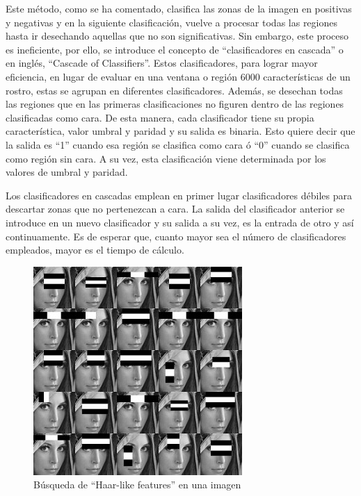 Este método, como se ha comentado, clasifica las zonas de la imagen en positivas y negativas y en la siguiente clasificación, vuelve a procesar todas las regiones hasta ir desechando aquellas que no son significativas. Sin embargo, este proceso es ineficiente, por ello, se introduce el concepto de ``clasificadores en cascada'' o en inglés, ``Cascade of Classifiers''. Estos clasificadores, para lograr mayor eficiencia, en lugar de evaluar en una ventana o región 6000 características de un rostro, estas se agrupan en diferentes clasificadores. Además, se desechan todas las regiones que en las primeras clasificaciones no figuren dentro de las regiones clasificadas como cara. De esta manera, cada clasificador tiene su propia característica, valor umbral y paridad y su salida es binaria. Esto quiere decir que la salida es ``1'' cuando esa región se clasifica como cara ó ``0'' cuando se clasifica como región sin cara. A su vez, esta clasificación viene determinada por los valores de umbral y paridad.

Los clasificadores en cascadas emplean en primer lugar clasificadores débiles para descartar zonas que no pertenezcan a cara. La salida del clasificador anterior se introduce en un nuevo clasificador y su salida a su vez, es la entrada de otro y así continuamente. Es de esperar que, cuanto mayor sea el número de clasificadores empleados, mayor es el tiempo de cálculo.


\begin{figure}
\centering
\includegraphics[scale = 0.7]{capitulo_02/figuras_dir/haarcascade.jpg}
\caption{Búsqueda de ``Haar-like features'' en una imagen}
\end{figure}

 







